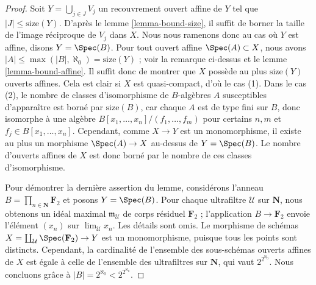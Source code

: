 \begin{proof}
Soit $Y = \bigcup_{j \in J} V_j$ un recouvrement ouvert affine de $Y$ tel que
$|J| \leq \text{size}(Y)$. D'après le lemme \ref{lemma-bound-size}, il suffit
de borner la taille de l'image réciproque de $V_j$ dans $X$. Nous nous ramenons
donc au cas où $Y$ est affine, disons $Y = \Spec(B)$. Pour tout ouvert affine
$\Spec(A) \subset X$, nous avons
$|A| \leq \max(|B|, \aleph_0) = \text{size}(Y)$ ; voir la remarque ci-dessus
et le lemme \ref{lemma-bound-affine}. Il suffit donc de montrer que $X$ possède
au plus $\text{size}(Y)$ ouverts affines. Cela est clair si $X$ est
quasi-compact, d'où le cas (1). Dans le cas (2), le nombre de classes
d'isomorphisme de $B$-algèbres $A$ susceptibles d'apparaître est borné par
$\text{size}(B)$, car chaque $A$ est de type fini sur $B$, donc isomorphe à une
algèbre $B[x_1, \ldots, x_n]/(f_1, \ldots, f_m)$ pour certains $n, m$ et
$f_j \in B[x_1, \ldots, x_n]$. Cependant, comme $X \to Y$ est un
monomorphisme, il existe au plus un morphisme $\Spec(A) \to X$ au-dessus de
$Y = \Spec(B)$. Le nombre d'ouverts affines de $X$ est donc borné par le nombre
de ces classes d'isomorphisme.

\medskip\noindent
Pour démontrer la dernière assertion du lemme, considérons l'anneau
$B = \prod_{n \in \mathbf{N}} \mathbf{F}_2$ et posons $Y = \Spec(B)$. Pour
chaque ultrafiltre $\mathcal{U}$ sur $\mathbf{N}$, nous obtenons un idéal
maximal $\mathfrak m_\mathcal{U}$ de corps résiduel $\mathbf{F}_2$ ;
l'application $B \to \mathbf{F}_2$ envoie l'élément $(x_n)$ sur
$\lim_\mathcal{U} x_n$. Les détails sont omis. Le morphisme de schémas
$X = \coprod_\mathcal{U} \Spec(\mathbf{F}_2) \to Y$ est un monomorphisme,
puisque tous les points sont distincts. Cependant, la cardinalité de l'ensemble
des sous-schémas ouverts affines de $X$ est égale à celle de l'ensemble des
ultrafiltres sur $\mathbf{N}$, qui vaut $2^{2^{\aleph_0}}$. Nous concluons grâce
à $|B| = 2^{\aleph_0} < 2^{2^{\aleph_0}}$.
\end{proof}
